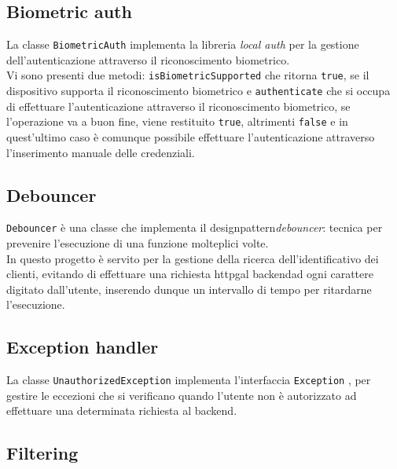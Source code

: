 \subsection{Biometric auth}
\label{subsec:biometric-auth}

La classe \lstinline{BiometricAuth} implementa la libreria \emph{local auth} \cite{site:local-auth} per la gestione dell'autenticazione attraverso il riconoscimento biometrico. \\
Vi sono presenti due metodi: \lstinline{isBiometricSupported} che ritorna \lstinline{true}, se il dispositivo supporta il riconoscimento biometrico e \lstinline{authenticate} che si occupa di effettuare l'autenticazione attraverso il riconoscimento biometrico, se l'operazione va a buon fine, viene restituito \lstinline{true}, altrimenti \lstinline{false} e in quest'ultimo caso è comunque possibile effettuare l'autenticazione attraverso l'inserimento manuale delle credenziali.

\subsection{Debouncer}
\label{subsec:debouncer}

\lstinline{Debouncer} è una classe che implementa il \gls{designpattern}\glsoccur \emph{debouncer}: tecnica per prevenire l'esecuzione di una funzione molteplici volte. \\
In questo progetto è servito per la gestione della ricerca dell'identificativo dei clienti, evitando di effettuare una richiesta \gls{httpg}\glsoccur al \gls{backend}\glsoccur ad ogni carattere digitato dall'utente, inserendo dunque un intervallo di tempo per ritardarne l'esecuzione.

\subsection{Exception handler}
\label{subsec:exception-handler}

La classe \lstinline{UnauthorizedException} implementa l'interfaccia \lstinline{Exception} \cite{site:exception}, per gestire le eccezioni che si verificano quando l'utente non è autorizzato ad effettuare una determinata richiesta al \gls{backend}\glsoccur. 

\subsection{Filtering}
\label{subsec:filtering}

